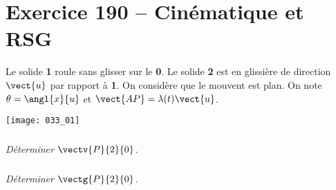 \section*{Exercice 190 -- Cinématique et RSG}
\setcounter{exo}{0}

Le solide \textbf{1} roule sans glisser sur le \textbf{0}. Le solide \textbf{2} est en glissière de direction $\vect{u}$ par rapport à \textbf{1}. On considère que le mouvent est plan. 
On note $\theta=\angl{x}{u}$ et $\vect{AP}=\lambda(t)\vect{u}$. 

\begin{center}
\texttt{[image: 033\_01]}
\end{center}

\subparagraph{}
\textit{Déterminer $\vectv{P}{2}{0}$.}
\ifprof
\begin{corrige}

\end{corrige}
\else
\fi

\subparagraph{}
\textit{Déterminer $\vectg{P}{2}{0}$.}
\ifprof
\begin{corrige}

\end{corrige}
\else
\fi
